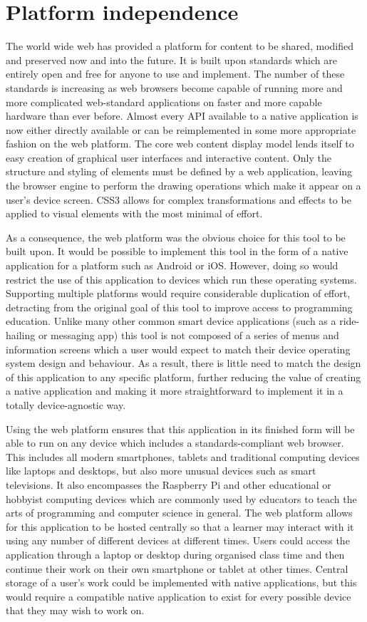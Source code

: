 \section{Platform independence}

The world wide web has provided a platform for content to be shared, modified and preserved now and into the future. It is built upon standards which are entirely open and free for anyone to use and implement. The number of these standards is increasing as web browsers become capable of running more and more complicated web-standard applications on faster and more capable hardware than ever before. Almost every API available to a native application is now either directly available or can be reimplemented in some more appropriate fashion on the web platform. The core web content display model lends itself to easy creation of graphical user interfaces and interactive content. Only the structure and styling of elements must be defined by a web application, leaving the browser engine to perform the drawing operations which make it appear on a user's device screen. CSS3 allows for complex transformations and effects to be applied to visual elements with the most minimal of effort.

As a consequence, the web platform was the obvious choice for this tool to be built upon. It would be possible to implement this tool in the form of a native application for a platform such as Android or iOS. However, doing so would restrict the use of this application to devices which run these operating systems. Supporting multiple platforms would require considerable duplication of effort, detracting from the original goal of this tool to improve access to programming education. Unlike many other common smart device applications (such as a ride-hailing or messaging app) this tool is not composed of a series of menus and information screens which a user would expect to match their device operating system design and behaviour. As a result, there is little need to match the design of this application to any specific platform, further reducing the value of creating a native application and making it more straightforward to implement it in a totally device-agnostic way.

Using the web platform ensures that this application in its finished form will be able to run on any device which includes a standards-compliant web browser. This includes all modern smartphones, tablets and traditional computing devices like laptops and desktops, but also more unusual devices such as smart televisions. It also encompasses the Raspberry Pi and other educational or hobbyist computing devices which are commonly used by educators to teach the arts of programming and computer science in general. The web platform allows for this application to be hosted centrally so that a learner may interact with it using any number of different devices at different times. Users could access the application through a laptop or desktop during organised class time and then continue their work on their own smartphone or tablet at other times. Central storage of a user's work could be implemented with native applications, but this would require a compatible native application to exist for every possible device that they may wish to work on.